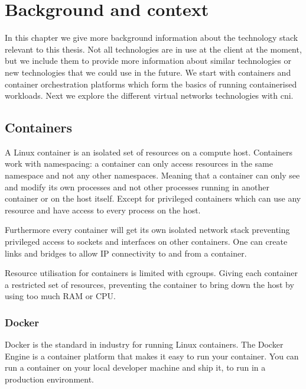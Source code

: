 \chapter{Background and context}
\label{chap:background}

In this chapter we give more background information about the technology stack relevant to this thesis. Not all technologies are in use at the client  at the moment, but we include them to provide more information about similar technologies or new technologies that we could use in the future. We start with containers and container orchestration platforms which form the basics of running containerised workloads. Next we explore the different virtual networks technologies with \gls{cni}.

\section{Containers}
\label{sec:containers}
A Linux container is an isolated set of resources on a compute host. Containers work with namespacing: a container can only access resources in the same namespace and not any other namespaces. Meaning that a container can only see and modify its own processes and not other processes running in another container or on the host itself. Except for privileged containers which can use any resource and have access to every process on the host. 

Furthermore every container will get its own isolated network stack preventing privileged access to sockets and interfaces on other containers. One can create links and bridges to allow IP connectivity to and from a container.

Resource utilisation for containers is limited with \glspl{cgroup}. Giving each container a restricted set of resources, preventing the container to bring down the host by using too much RAM or CPU\cite{docker_security}.

\subsection{Docker}
\label{subsec:docker}
Docker is the standard in industry for running Linux containers. The Docker Engine is a container platform that makes it easy to run your container. You can run a container on your local developer machine and ship it, to run in a production environment.

